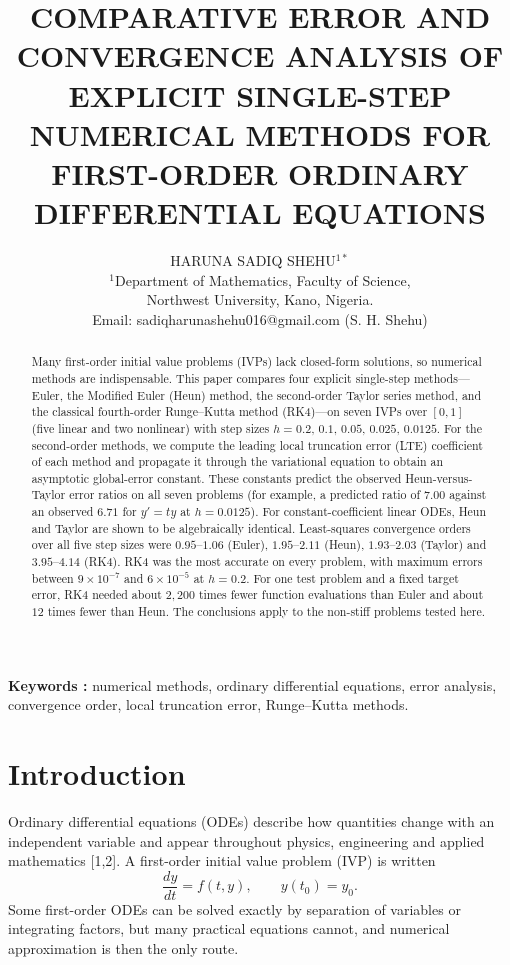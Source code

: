\documentclass[10pt,letterpaper]{article}
\title{COMPARATIVE ERROR AND CONVERGENCE ANALYSIS OF\\ EXPLICIT SINGLE-STEP NUMERICAL METHODS FOR\\ FIRST-ORDER ORDINARY DIFFERENTIAL EQUATIONS}
\author{HARUNA SADIQ SHEHU$^{1*}$\\[4pt]
\small $^{1}$Department of Mathematics, Faculty of Science,\\ Northwest University, Kano, Nigeria.\\[2pt]
\small Email: sadiqharunashehu016@gmail.com (S. H. Shehu)}
\date{}
\begin{document}
\maketitle

\begin{abstract}
Many first-order initial value problems (IVPs) lack closed-form solutions, so numerical methods are indispensable. This paper compares four explicit single-step methods---Euler, the Modified Euler (Heun) method, the second-order Taylor series method, and the classical fourth-order Runge--Kutta method (RK4)---on seven IVPs over $[0,1]$ (five linear and two nonlinear) with step sizes $h=0.2,\,0.1,\,0.05,\,0.025,\,0.0125$. For the second-order methods, we compute the leading local truncation error (LTE) coefficient of each method and propagate it through the variational equation to obtain an asymptotic global-error constant. These constants predict the observed Heun-versus-Taylor error ratios on all seven problems (for example, a predicted ratio of $7.00$ against an observed $6.71$ for $y'=ty$ at $h=0.0125$). For constant-coefficient linear ODEs, Heun and Taylor are shown to be algebraically identical. Least-squares convergence orders over all five step sizes were $0.95$--$1.06$ (Euler), $1.95$--$2.11$ (Heun), $1.93$--$2.03$ (Taylor) and $3.95$--$4.14$ (RK4). RK4 was the most accurate on every problem, with maximum errors between $9\times10^{-7}$ and $6\times10^{-5}$ at $h=0.2$. For one test problem and a fixed target error, RK4 needed about $2{,}200$ times fewer function evaluations than Euler and about $12$ times fewer than Heun. The conclusions apply to the non-stiff problems tested here.
\end{abstract}

\noindent\textbf{Keywords :} numerical methods, ordinary differential equations, error analysis, convergence order, local truncation error, Runge--Kutta methods.

\section{Introduction}
Ordinary differential equations (ODEs) describe how quantities change with an independent variable and appear throughout physics, engineering and applied mathematics [1,2]. A first-order initial value problem (IVP) is written
\begin{equation}
\frac{dy}{dt}=f(t,y),\qquad y(t_0)=y_0. \label{eq:ivp}
\end{equation}
Some first-order ODEs can be solved exactly by separation of variables or integrating factors, but many practical equations cannot, and numerical approximation is then the only route.
\end{document}
